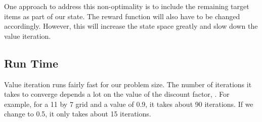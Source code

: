 \documentclass{pset}
\begin{document}
One approach to address this non-optimality is to include the remaining target items as part of our state. 
The reward function will also have to be changed accordingly. However, this will increase the state
space greatly and slow down the value iteration. 


\subsection{Run Time}
Value iteration runs fairly fast for our problem size. The number of iterations it takes to converge
depends a lot on the value of the discount factor, \gamma. For example, for a 11 by 7 grid and a
\gamma value of 0.9, it takes about 90 iterations. If we change \gamma to 0.5, it only takes about
15 iterations. 




\end{document}
